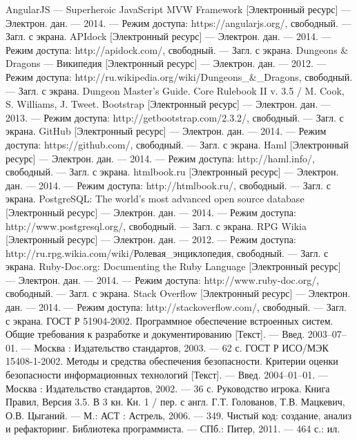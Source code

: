 \begin{thebibliography}{@@@@}
   AngularJS --- Superheroic JavaScript MVW Framework [Электронный ресурс] --- Электрон. дан. --- 2014. --- Режим доступа: https://angularjs.org/, свободный. --- Загл. с экрана.
   APIdock [Электронный ресурс] --- Электрон. дан. --- 2014. --- Режим доступа: http://apidock.com/, свободный. --- Загл. с экрана.
   Dungeons \& Dragons — Википедия [Электронный ресурс] --- Электрон. дан. --- 2012. --- Режим доступа: http://ru.wikipedia.org/wiki/Dungeons\_\&\_Dragons, свободный. --- Загл. с экрана.
   Dungeon Master's Guide. Core Rulebook II v. 3.5 / M. Cook, S. Williams, J. Tweet.
   Bootstrap [Электронный ресурс] --- Электрон. дан. --- 2013. --- Режим доступа: http://getbootstrap.com/2.3.2/, свободный. --- Загл. с экрана.
   GitHub [Электронный ресурс] --- Электрон. дан. --- 2014. --- Режим доступа: https://github.com/, свободный. --- Загл. с экрана.
   Haml [Электронный ресурс] --- Электрон. дан. --- 2014. --- Режим доступа: http://haml.info/, свободный. --- Загл. с экрана.
   htmlbook.ru [Электронный ресурс] --- Электрон. дан. --- 2014. --- Режим доступа: http://htmlbook.ru/, свободный. --- Загл. с экрана.
   PostgreSQL: The world's most advanced open source database [Электронный ресурс] --- Электрон. дан. --- 2014. --- Режим доступа: http://www.postgresql.org/, свободный. --- Загл. с экрана.
   RPG Wikia [Электронный ресурс] --- Электрон. дан. --- 2012. --- Режим доступа: http://ru.rpg.wikia.com/wiki/Ролевая\_энциклопедия, свободный. --- Загл. с экрана.
   Ruby-Doc.org: Documenting the Ruby Language [Электронный ресурс] --- Электрон. дан. --- 2014. --- Режим доступа: http://www.ruby-doc.org/, свободный. --- Загл. с экрана.
   Stack Overflow [Электронный ресурс] --- Электрон. дан. --- 2014. --- Режим доступа: http://stackoverflow.com/, свободный. --- Загл. с экрана.
   ГОСТ Р 51904-2002. Программное обеспечение встроенных систем. Общие требования к разработке и документированию [Текст]. --- Введ. 2003–07–01. --- Москва : Издательство стандартов, 2003. --- 62 с. 
   ГОСТ Р ИСО/МЭК 15408-1-2002. Методы и средства обеспечения безопасности. Критерии оценки безопасности информационных технологий [Текст]. --- Введ. 2004–01–01. --- Москва : Издательство стандартов, 2002. --- 36 с.
   Руководство игрока. Книга Правил, Версия 3.5. В 3 кн. Кн. 1 / пер. с англ. Г.Т. Голованов, Т.В. Мацкевич, О.В. Цыганий. — М.: АСТ : Астрель, 2006. — 349.
   Чистый код: создание, анализ и рефакторинг. Библиотека программиста. --- СПб.: Питер, 2011. --- 464 с.: ил.
\end{thebibliography}
